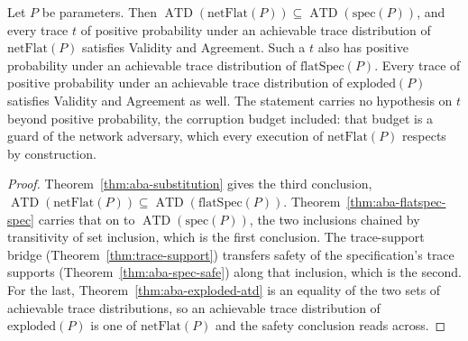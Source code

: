 \begin{theorem}
  \label{thm:aba-netflat}
  \leanok
  Let $P$ be parameters.
  Then $\operatorname{ATD}(\mathrm{netFlat}(P)) \subseteq \operatorname{ATD}(\mathrm{spec}(P))$, and every trace $t$ of positive probability under an achievable trace distribution of $\mathrm{netFlat}(P)$ satisfies Validity and Agreement.
  Such a $t$ also has positive probability under an achievable trace distribution of $\mathrm{flatSpec}(P)$.
  Every trace of positive probability under an achievable trace distribution of $\mathrm{exploded}(P)$ satisfies Validity and Agreement as well.
  The statement carries no hypothesis on $t$ beyond positive probability, the corruption budget included: that budget is a guard of the network adversary, which every execution of $\mathrm{netFlat}(P)$ respects by construction.
\end{theorem}

\begin{proof}\leanok
  Theorem~\ref{thm:aba-substitution} gives the third conclusion, $\operatorname{ATD}(\mathrm{netFlat}(P)) \subseteq \operatorname{ATD}(\mathrm{flatSpec}(P))$.
  Theorem~\ref{thm:aba-flatspec-spec} carries that on to $\operatorname{ATD}(\mathrm{spec}(P))$, the two inclusions chained by transitivity of set inclusion, which is the first conclusion.
  The trace-support bridge (Theorem~\ref{thm:trace-support}) transfers safety of the specification's trace supports (Theorem~\ref{thm:aba-spec-safe}) along that inclusion, which is the second.
  For the last, Theorem~\ref{thm:aba-exploded-atd} is an equality of the two sets of achievable trace distributions, so an achievable trace distribution of $\mathrm{exploded}(P)$ is one of $\mathrm{netFlat}(P)$ and the safety conclusion reads across.
\end{proof}
